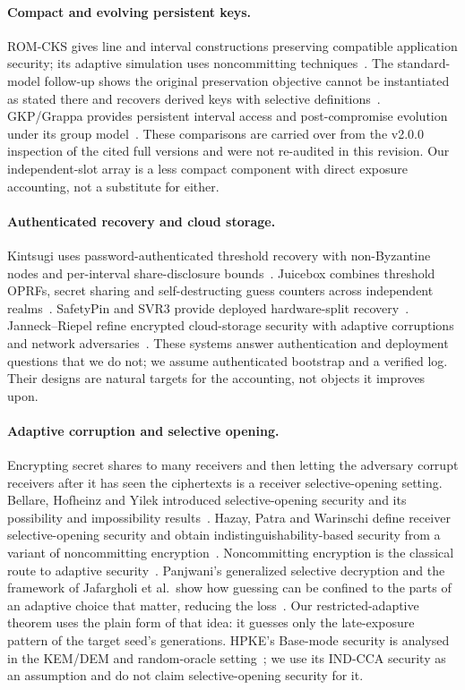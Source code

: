 \documentclass[pdflatex,sn-mathphys-num]{sn-jnl}
\theoremstyle{plain}
\theoremstyle{definition}
\begin{document}
\paragraph{Compact and evolving persistent keys.}
ROM-CKS gives line and interval constructions preserving compatible application security; its adaptive simulation uses noncommitting techniques~\cite{dodis2024}. The standard-model follow-up shows the original preservation objective cannot be instantiated as stated there and recovers derived keys with selective definitions~\cite{dodisstandard2024}. GKP/Grappa provides persistent interval access and post-compromise evolution under its group model~\cite{backendal2026}. These comparisons are carried over from the v2.0.0 inspection of the cited full versions and were not re-audited in this revision. Our independent-slot array is a less compact component with direct exposure accounting, not a substitute for either.

\paragraph{Authenticated recovery and cloud storage.}
Kintsugi uses password-authenticated threshold recovery with non-Byzantine nodes and per-interval share-disclosure bounds~\cite{ma2025}. Juicebox combines threshold OPRFs, secret sharing and self-destructing guess counters across independent realms~\cite{trapp2025}. SafetyPin and SVR3 provide deployed hardware-split recovery~\cite{dauterman2020,connell2024}. Janneck--Riepel refine encrypted cloud-storage security with adaptive corruptions and network adversaries~\cite{janneck2026}. These systems answer authentication and deployment questions that we do not; we assume authenticated bootstrap and a verified log. Their designs are natural targets for the accounting, not objects it improves upon.

\paragraph{Adaptive corruption and selective opening.}
Encrypting secret shares to many receivers and then letting the adversary corrupt receivers after it has seen the ciphertexts is a receiver selective-opening setting. Bellare, Hofheinz and Yilek introduced selective-opening security and its possibility and impossibility results~\cite{bellare2009}. Hazay, Patra and Warinschi define receiver selective-opening security and obtain indistinguishability-based security from a variant of noncommitting encryption~\cite{hazay2015}. Noncommitting encryption is the classical route to adaptive security~\cite{canetti1996}. Panjwani's generalized selective decryption and the framework of Jafargholi et al.\ show how guessing can be confined to the parts of an adaptive choice that matter, reducing the loss~\cite{panjwani2007,jafargholi2017}. Our restricted-adaptive theorem uses the plain form of that idea: it guesses only the late-exposure pattern of the target seed's generations. HPKE's Base-mode security is analysed in the KEM/DEM and random-oracle setting~\cite{rfc9180,alwen2021}; we use its IND-CCA security as an assumption and do not claim selective-opening security for it.
\end{document}

